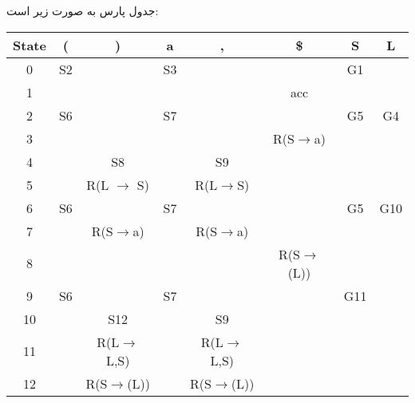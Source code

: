 جدول پارس به صورت زیر است:


\begin{center}
\begin{latin}
\begin{tabular}{|c|c|c|c|c|c|c|c|}
\hline
State & (  & )                      & a  & ,                      & \$                     & S   & L   \\ \hline
0     & S2 &                        & S3 &                        &                        & G1  &     \\ \hline
1     &    &                        &    &                        & acc                    &     &     \\ \hline
2     & S6 &                        & S7 &                        &                        & G5  & G4  \\ \hline
3     &    &                        &    &                        & R(S$\rightarrow${}a)   &     &     \\ \hline
4     &    & S8                     &    & S9                     &                        &     &     \\ \hline
5     &    & R(L $\rightarrow$ S)   &    & R(L$\rightarrow${}S)   &                        &     &     \\ \hline
6     & S6 &                        & S7 &                        &                        & G5  & G10 \\ \hline
7     &    & R(S$\rightarrow${}a)   &    & R(S$\rightarrow${}a)   &                        &     &     \\ \hline
8     &    &                        &    &                        & R(S$\rightarrow${}(L)) &     &     \\ \hline
9     & S6 &                        & S7 &                        &                        & G11 &     \\ \hline
10    &    & S12                    &    & S9                     &                        &     &     \\ \hline
11    &    & R(L$\rightarrow${}L,S) &    & R(L$\rightarrow${}L,S) &                        &     &     \\ \hline
12    &    & R(S$\rightarrow${}(L)) &    & R(S$\rightarrow${}(L)) &                        &     &     \\ \hline
\end{tabular}
\end{latin}
\end{center}

